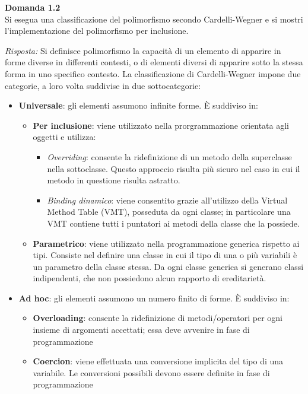 \documentclass{article}
\newenvironment{problem}[2][Domanda]
    { \begin{mdframed}[backgroundcolor=gray!20] \textbf{#1 #2} \\}
    {  \end{mdframed}}
\newenvironment{solution}
    {\textit{Risposta:}}
    {}
\begin{document}
\begin{problem}{1.2}
Si esegua una classificazione del polimorfismo secondo Cardelli-Wegner e si mostri l'implementazione del polimorfismo per inclusione.
\end{problem}
\begin{solution}
Si definisce polimorfismo la capacità di un elemento di apparire in forme diverse in differenti contesti, o di elementi diversi di apparire sotto la stessa forma in uno specifico contesto.
La classificazione di Cardelli-Wegner impone due categorie, a loro volta suddivise in due sottocategorie:
\begin{itemize}
	\item \textbf{Universale}: gli elementi assumono infinite forme.
	\newline
	È suddiviso in:
	\begin{itemize}
		\item \textbf{Per inclusione}: viene utilizzato nella prorgrammazione orientata agli oggetti e utilizza:
		\begin{itemize}
			\item \textit{Overriding}: consente la ridefinizione di un metodo della superclasse nella sottoclasse. Questo approccio risulta più sicuro nel caso in cui il metodo in questione risulta astratto.
			\item \textit{Binding dinamico}: viene consentito grazie all'utilizzo della Virtual Method Table (VMT), posseduta da ogni classe; in particolare una VMT contiene tutti i puntatori ai metodi della classe che la possiede.
		\end{itemize}
		\item \textbf{Parametrico}: viene utilizzato nella programmazione generica rispetto ai tipi.
		Consiste nel definire una classe in cui il tipo di una o più variabili è un parametro della classe stessa.
		Da ogni classe generica si generano classi indipendenti, che non possiedono alcun rapporto di ereditarietà.
	\end{itemize}

	\item \textbf{Ad hoc}: gli elementi assumono un numero finito di forme.
	È suddiviso in:
	\begin{itemize}
		\item \textbf{Overloading}: consente la ridefinizione di metodi/operatori per ogni insieme di argomenti
		accettati; essa deve avvenire in fase di programmazione

		\item \textbf{Coercion}: viene effettuata una conversione implicita del tipo di una variabile. Le conversioni possibili devono essere definite in fase
		di programmazione


\end{itemize}
\end{itemize}
\end{solution}
\end{document}
